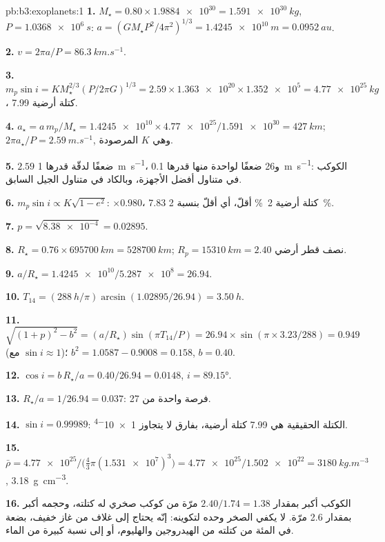 \begin{solution}{pb:b3:exoplanets:1}
\textbf{1.} $M_\star = 0.80\times\num{1.9884e30} = \qty{1.591e30}{kg}$, $P =
\qty{1.0368e6}{s}$: $a = (GM_\star P^2/4\pi^2)^{1/3} = \qty{1.4245e10}{m}
= \qty{0.0952}{au}$.

\textbf{2.} $v = 2\pi a/P = \qty{86.3}{km.s^{-1}}$.

\textbf{3.} $m_p\sin i = KM_\star^{2/3}(P/2\pi G)^{1/3} = 2.59\times\num{1.363e20}
\times\num{1.352e5} = \qty{4.77e25}{kg}$، \num{7.99} كتلة أرضية.

\textbf{4.} $a_\star = a\,m_p/M_\star = \num{1.4245e10}\times\num{4.77e25}/
\num{1.591e30} = \qty{427}{km}$; $2\pi a_\star/P = \qty{2.59}{m.s^{-1}}$,
وهي $K$ المرصودة.

\textbf{5.} $2.59$ ضعفًا لدقّة قدرها \qty{1}{m.s^{-1}}، و26 ضعفًا لواحدة منها قدرها
\qty{0.1}{m.s^{-1}}: الكوكب في متناول أفضل الأجهزة،
وبالكاد في متناول الجيل السابق.

\textbf{6.} $m_p\sin i \propto K\sqrt{1 - e^2}$: $\times0.980$، 7.83 كتلة أرضية
\qty{2}{\percent} أقلّ، أي أقلّ بنسبة \qty{2}{\percent}.

\textbf{7.} $p = \sqrt{\num{8.38e-4}} = 0.02895$.

\textbf{8.} $R_\star = 0.76\times\qty{695700}{km} = \qty{528700}{km}$; $R_p =
\qty{15310}{km} = 2.40$ نصف قطر أرضي.

\textbf{9.} $a/R_\star = \num{1.4245e10}/\num{5.287e8} = 26.94$.

\textbf{10.} $T_{14} = (\qty{288}{h}/\pi)\arcsin(1.02895/26.94) = \qty{3.50}{h}$.

\textbf{11.} $\sqrt{(1 + p)^2 - b^2} = (a/R_\star)\sin(\pi T_{14}/P) = 26.94\times
\sin(\pi\times3.23/288) = 0.949$ (مع $\sin i \approx 1$)؛ $b^2 =
1.0587 - 0.9008 = 0.158$, $b = 0.40$.

\textbf{12.} $\cos i = b\,R_\star/a = 0.40/26.94 = 0.0148$, $i = \ang{89.15}$.

\textbf{13.} $R_\star/a = 1/26.94 = 0.037$: فرصة واحدة من 27.

\textbf{14.} $\sin i = 0.99989$: الكتلة الحقيقية هي 7.99 كتلة أرضية، 
بفارق لا يتجاوز \num{1e-4}.

\textbf{15.} $\bar\rho = \num{4.77e25}/\bigl(\tfrac43\pi(\num{1.531e7})^3\bigr) =
\num{4.77e25}/\num{1.502e22} = \qty{3180}{kg.m^{-3}}$,
\qty{3.18}{g.cm^{-3}}.

\textbf{16.} الكوكب أكبر بمقدار $2.40/1.74 = 1.38$ مرّة من كوكب صخري له كتلته،
وحجمه أكبر بمقدار 2.6 مرّة. لا يكفي الصخر وحده لتكوينه: إنّه يحتاج إلى
غلاف من غاز خفيف، بضعة في المئة من كتلته من الهيدروجين والهليوم،
أو إلى نسبة كبيرة من الماء.


\end{solution}
